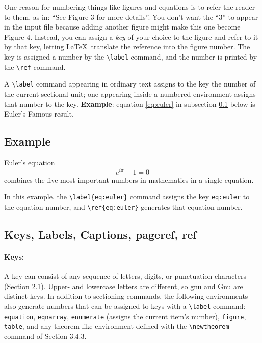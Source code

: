 \documentclass{article}
\newcommand{\justtext}[1]{\texttt{\textbackslash #1}}
\begin{document}
One reason for numbering things like figures and equations is to refer the reader to them, as
in: ``See Figure 3 for more details''. You don't want the ``3'' to appear in the input file because
adding another figure might make this one become Figure 4. Instead, you can assign a \emph{key} of
your choice to the figure and refer to it by that key, letting \LaTeX\ translate the reference into
the figure number. The key is assigned a number by the \justtext{label} command, and the number is
printed by the \justtext{ref} command.

A \justtext{label} command appearing in ordinary text assigns to the key the number of the current
sectional unit; one appearing inside a numbered environment assigns that number to the key. 
\textbf{Example}: equation \ref{eq:euler} in subsection \ref{sample_subsection} below is Euler's
Famous result. 

\subsection{Example}\label{sample_subsection}

Euler's equation
\begin{equation}
   e^{i\pi} + 1 = 0 \label{eq:euler}
\end{equation}
combines the five most important numbers in mathematics in a single equation.

In this example, the \justtext{label\{eq:euler\}} command assigns the key {\tt eq:euler} to the
equation number, and \justtext{ref\{eq:euler\}} generates that equation number.

\subsection{Keys, Labels, Captions, pageref, ref}

\paragraph{Keys:} A key can consist of any sequence of letters, digits, or punctuation characters
 (Section 2.1). Upper- and lowercase letters are different, so gnu and Gnu are distinct keys. In
 addition to sectioning commands, the following environments also generate numbers that can be
 assigned to keys with a \justtext{label} command: 
 {\tt equation}, 
 {\tt eqnarray},
 {\tt enumerate} (assigns the current item's number), 
 {\tt figure}, 
 {\tt table}, 
 and any theorem-like environment defined with the \justtext{newtheorem} command of Section 3.4.3.
\end{document}
